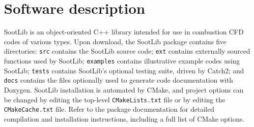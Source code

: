 \documentclass[preprint,letterpaper]{elsarticle}
\begin{document}

\section{Software description}
\label{s:architecture}

SootLib is an object-oriented C++ library intended for use in combustion CFD codes of various types.
Upon download, the SootLib package contains five directories: \texttt{src} contains the SootLib source code; \texttt{ext} contains externally sourced functions used by SootLib; \texttt{examples} contains illustrative example codes using SootLib; \texttt{tests} contains SootLib's optional testing suite, driven by Catch2; and \texttt{docs} contains the files optionally used to generate code documentation with Doxygen.
SootLib installation is automated by CMake, and project options can be changed by editing the top-level \texttt{CMakeLists.txt} file or by editing the \texttt{CMakeCache.txt} file. Refer to the package documentation for detailed compilation and installation instructions, including a full list of CMake options.
\end{document}
